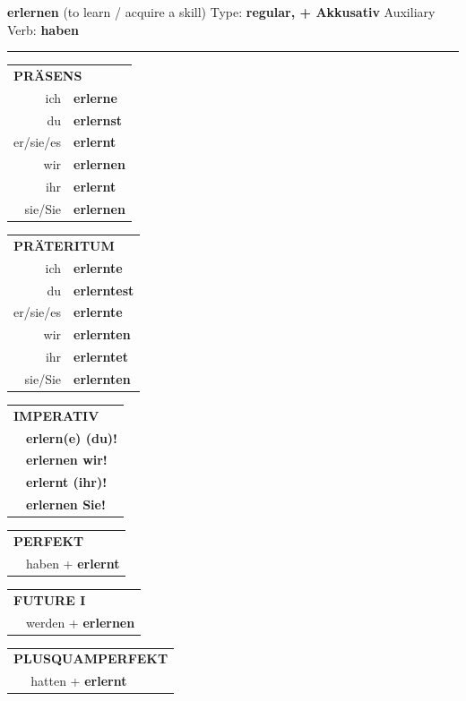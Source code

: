 \documentclass[10pt,a4paper]{revtex4-2}
\begin{document}
\begin{verbbox-acc}
{\Large \bf erlernen} (to learn / acquire a skill) \hfill Type: \textbf{regular, + Akkusativ} \hfill Auxiliary Verb: \textbf{haben}

\vspace{5pt}
\hrule
\vspace{5pt}

\begin{tabular}{rl}
\multicolumn{2}{l}{\textbf{PRÄSENS}}\\
ich & \textbf{erlerne}\\
du & \textbf{erlernst}\\
er/sie/es & \textbf{erlernt}\\
wir & \textbf{erlernen}\\
ihr & \textbf{erlernt}\\
sie/Sie & \textbf{erlernen}\\
\end{tabular}
\hfill
\begin{tabular}{rl}
\multicolumn{2}{l}{\textbf{PRÄTERITUM}}\\
ich & \textbf{erlernte}\\
du & \textbf{erlerntest}\\
er/sie/es & \textbf{erlernte}\\
wir & \textbf{erlernten}\\
ihr & \textbf{erlerntet}\\
sie/Sie & \textbf{erlernten}\\
\end{tabular}
\hfill
\begin{tabular}{rl}
\multicolumn{2}{l}{\textbf{IMPERATIV}}\\
& \textbf{erlern(e) (du)!}\\
& \textbf{erlernen wir!}\\
& \textbf{erlernt (ihr)!}\\
& \textbf{erlernen Sie!}\\
\end{tabular}

\vspace{10pt}

\begin{tabular}{rl}
\multicolumn{2}{l}{\textbf{PERFEKT}}\\
& haben + \textbf{erlernt}\\
\end{tabular}
\hfill
\begin{tabular}{rl}
\multicolumn{2}{l}{\textbf{FUTURE I}}\\
& werden + \textbf{erlernen}\\
\end{tabular}
\hfill
\begin{tabular}{rl}
\multicolumn{2}{l}{\textbf{PLUSQUAMPERFEKT}}\\
& hatten + \textbf{erlernt}\\
\end{tabular}


\end{verbbox-acc}
\end{document}
